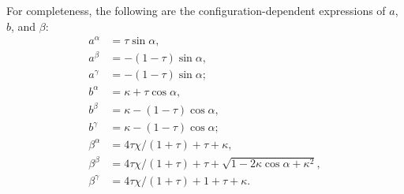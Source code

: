     For completeness, the following are the configuration-dependent expressions of $a$, $b$, and
    $\beta$:
    \begin{align}
        \label{eq:aa}
        a^{\alpha}  &= \tau\sin\alpha,\\
        \label{eq:ab}
        a^{\beta}   &= -(1 - \tau)\sin\alpha,\\
        \label{eq:ag}
        a^{\gamma}  &= -(1 - \tau)\sin\alpha;\\
        \label{eq:ba}
        b^{\alpha}  &= \kappa + \tau\cos\alpha,\\
        \label{eq:bb}
        b^{\beta}   &= \kappa - (1 - \tau)\cos\alpha,\\
        \label{eq:bg}
        b^{\gamma}  &= \kappa - (1 - \tau)\cos\alpha;\\
        \label{eq:betaa}
        \beta^{\alpha}  &= 4\tau\chi/(1 + \tau) + \tau + \kappa,\\
        \label{eq:betab}
        \beta^{\beta}   &= 4\tau\chi/(1 + \tau) + \tau + \sqrt{1 - 2\kappa\cos\alpha + \kappa^2},\\
        \label{eq:betag}
        \beta^{\gamma}  &= 4\tau\chi/(1 + \tau) + 1 + \tau + \kappa.
    \end{align}


